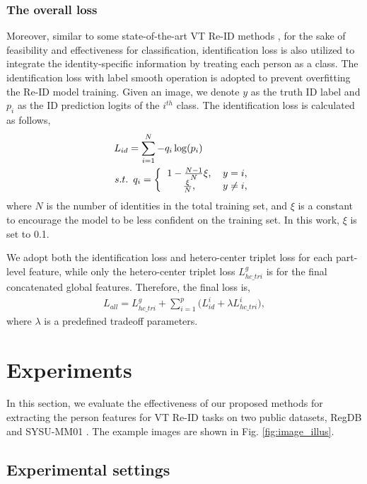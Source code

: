 \documentclass[journal]{IEEEtran}
\begin{document}
\subsubsection{The overall loss}
Moreover, similar to some state-of-the-art VT Re-ID methods \cite{hao2019hsme,wang2019learning1,ye2018visible,tifs19vtreid,zhu2019hetero}, for the sake of feasibility and effectiveness for classification, identification loss is also utilized to integrate the identity-specific information by treating each person as a class.
The identification loss with label smooth operation is adopted to prevent overfitting the Re-ID model training. Given an image, we denote $y$ as the truth ID label and $p_i$ as the ID prediction logits of the $i^{th}$ class. The identification loss is calculated as follows,
\begin{align}\label{eq:l_id}
  L_{id} &= \sum_{i=1}^{N} -q_{i} \log(p_i) \\
  s.t. & \,\,\,q_i = \left\{
    \begin{tabular}{cl}
    $ 1-\frac{N-1}{N}\xi$, & $y = i$,\\
    $\frac{\xi}{N}$, & $y \neq i$,
    \end{tabular}
    \right. \nonumber
\end{align}
where $N$ is the number of identities in the total training set, and $\xi$ is a constant to encourage the model to be less confident on the training set. In this work, $\xi$ is set to 0.1.

We adopt both the identification loss and hetero-center triplet loss for each part-level feature, while only the hetero-center triplet loss $L_{hc\_tri}^{g}$ is for the final concatenated global features. Therefore, the final loss is,
\begin{align}
    L_{all}  =   L_{hc\_tri}^{g} + \sum_{i=1}^{p} \big(L_{id}^{i} +  \lambda L_{hc\_tri}^{i}\big), \label{eq:final_loss}
\end{align}
where $\lambda$ is a predefined tradeoff parameters.

\section{Experiments}
\label{sec:exp}
In this section, we evaluate the effectiveness of our proposed methods for extracting the person features for VT Re-ID tasks on two public datasets, RegDB \cite{nguyen2017person} and  SYSU-MM01 \cite{wu2017rgb}. The example images are shown in Fig. \ref{fig:image_illus}.
\subsection{Experimental settings}
\label{ssec:settings}
\end{document}
